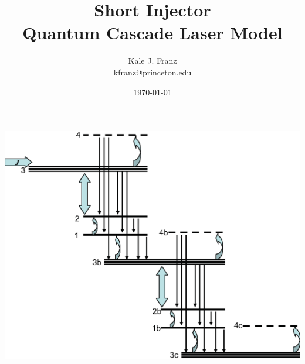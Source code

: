 \documentclass{article}      %
\title{Short Injector\\Quantum Cascade Laser Model}  %
\author{Kale J. Franz\\kfranz@princeton.edu}      %
\date{\today}      %
\begin{document}

\maketitle                   %

\bigskip
\begin{center}
\includegraphics[width=7in]{diagram}
\end{center}
\bigskip
\end{document}
